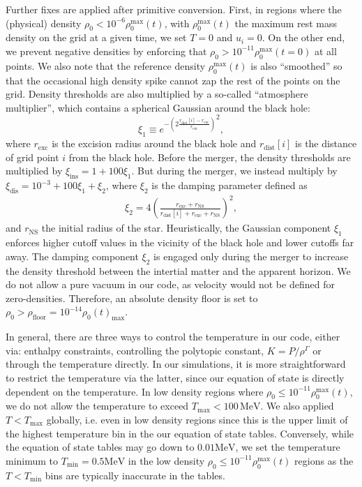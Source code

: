 Further fixes are applied after primitive conversion.  First, in regions where the (physical) density $\rho_0 < 10^{-6} \rho_0^\textrm{max}(t)$, with $\rho_0^\textrm{max}(t)$ the maximum rest mass density on the grid at a given time, we set $T=0$ and $u_i=0$.  On the other end, we prevent negative densities by enforcing that $\rho_0 > 10^{-11} \rho_0^\textrm{max}(t=0)$ at all points.  We also note that the reference density $\rho_0^\textrm{max}(t)$ is also ``smoothed'' so that the occasional high density spike cannot zap the rest of the points on the grid.  Density thresholds are also multiplied by a so-called ``atmosphere multiplier'', which contains a spherical Gaussian around the black hole:
\begin{equation}
\xi_1 \equiv {e^{- \left(2 \frac{ r_\textrm{dist}[i] - r_\textrm{exc}}{r_\textrm{exc}}\right)}}^2 ,
\end{equation}
where $r_\textrm{exc}$ is the excision radius around the black hole and $ r_\textrm{dist}[i]$ is the distance of grid point $i$ from the black hole.
Before the merger, the density thresholds are multiplied by $\xi_\textrm{ins} = 1 + 100 \xi_1$.  But during the merger, we instead multiply by $\xi_\textrm{dis}  = 10^{-3} + 100 \xi_1 + \xi_2$, where $\xi_2$ is the damping parameter defined as
\begin{eqnarray}
\xi_2 = 4 \left( \frac{r_\textrm{exc} + r_\textrm{NS}}
{ r_\textrm{dist}[i] + r_\textrm{exc} + r_\textrm{NS}}\right)^2 , 
\end{eqnarray}
and $ r_\textrm{NS}$ the initial radius of the star.
Heuristically, the Gaussian component $\xi_1$ enforces higher cutoff values in the vicinity of the black hole and lower cutoffs far away.
The damping component $\xi_2$ is engaged only during the merger to increase the density threshold between the intertial matter and the apparent horizon.
We do not allow a pure vacuum in our code, as velocity would not be defined for zero-densities.  Therefore, an absolute density floor is set to $\rho_0 >  \rho_\textrm{floor} = 10^{-14} \rho_0(t)_\textrm{max}$.  

In general, there are three ways to control the temperature in our code, either via: enthalpy constraints, controlling the polytopic constant, $K = P/{\rho^{\Gamma}}$ or through the temperature directly.  In our simulations, it is more straightforward to restrict the temperature via the latter, since our equation of state is directly dependent on the temperature.  In low density regions where $\rho_0 \le 10^{-11} \rho_0^\textrm{max}(t)$, we do not allow the temperature to exceed $T_\textrm{max} < 100\,\textrm{MeV}$.  We also applied $T < T_\textrm{max}$ globally, i.e. even in low density regions since this is the upper limit of the highest temperature bin in the our equation of state tables.  
Conversely, while the equation of state tables may go down to $0.01 \textrm{MeV}$, we set the temperature minimum to $T_\textrm{min} = 0.5 \textrm{MeV}$ in the low density $\rho_0 \le 10^{-11} \rho_0^\textrm{max}(t)$ regions as the $T < T_\textrm{min}$ bins are typically inaccurate in the tables.

